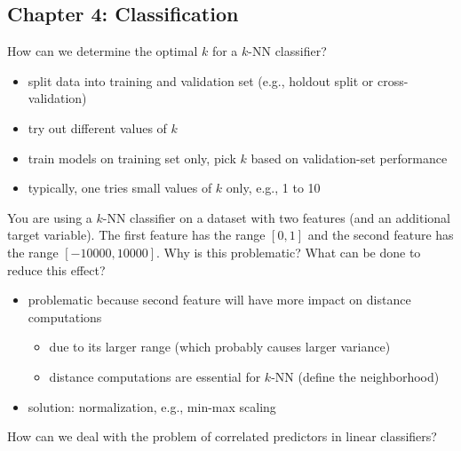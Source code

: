 \documentclass[12pt]{article}
\begin{document}
\subsection*{Chapter 4: Classification}

\begin{question}
	How can we determine the optimal $k$ for a $k$-NN classifier?
\end{question}

\begin{itemize}[left=0pt, nosep]
	\item split data into training and validation set (e.g., holdout split or cross-validation)
	\item try out different values of $k$
	\item train models on training set only, pick $k$ based on validation-set performance
	\item typically, one tries small values of $k$ only, e.g., 1 to 10
\end{itemize}

\begin{question}
	You are using a $k$-NN classifier on a dataset with two features (and an additional target variable).
	The first feature has the range $[0,1]$ and the second feature has the range $[-10000,10000]$.
	Why is this problematic?
	What can be done to reduce this effect?
\end{question}

\begin{itemize}[left=0pt, nosep]
	\item problematic because second feature will have more impact on distance computations
	\begin{itemize}[left=0pt, nosep]
		\item due to its larger range (which probably causes larger variance)
		\item distance computations are essential for $k$-NN (define the neighborhood)
	\end{itemize}
	\item solution: normalization, e.g., min-max scaling
\end{itemize}

\begin{question}
	How can we deal with the problem of correlated predictors in linear classifiers?
\end{question}
\end{document}
